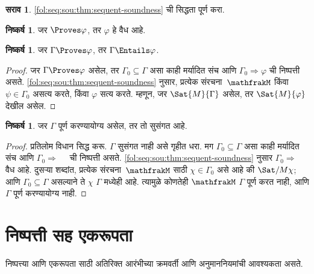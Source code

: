 \documentclass[11pt,a4paper,openany]{book}
\theoremstyle{definition}
\newtheorem{prob}{सराव}[chapter]
\newtheorem{cor}[defn]{निष्कर्ष}
\newcommand{\applytofirst}[2]{{\expandafter#1#2}}
\newcommand{\Struct}[1]{\applytofirst{\mathfrak}{#1}}
\newcommand{\Sequent}{\Rightarrow}
\begin{document}
\begin{prob}
\ref{fol:seq:sou:thm:sequent-soundness} ची सिद्धता पूर्ण करा.
\end{prob}




\begin{cor}
\label{fol:seq:sou:cor:weak-soundness}
जर $\Proves \varphi$, तर $\varphi$ हे वैध आहे.
\end{cor}

\begin{cor}
\label{fol:seq:sou:cor:entailment-soundness}
जर $\Gamma \Proves \varphi$, तर $\Gamma \Entails \varphi$.
\end{cor}

\begin{proof}
जर $\Gamma \Proves \varphi$ असेल, तर $\Gamma_0 \subseteq \Gamma$ असा काही
मर्यादित संच आणि $\Gamma_0 \Sequent \varphi$ ची निष्पत्ती असते. \ref{fol:seq:sou:thm:sequent-soundness}
नुसार, प्रत्येक
संरचना~$\Struct{M}$
किंवा $\psi \in \Gamma_0$ असत्य करते, किंवा $\varphi$ सत्य करते. म्हणून,
जर $\Sat{M}{\Gamma}$ असेल, तर
$\Sat{M}{\varphi}$ देखील असेल.
\end{proof}

\begin{cor}
\label{fol:seq:sou:cor:consistency-soundness}
जर $\Gamma$ पूर्ण करण्यायोग्य असेल, तर तो सुसंगत आहे.
\end{cor}

\begin{proof}
प्रतिलोम विधान सिद्ध करू. $\Gamma$ सुसंगत नाही असे गृहीत धरा. मग
$\Gamma_0 \subseteq \Gamma$ असा काही मर्यादित संच आणि
$\Gamma_0 \Sequent \quad$ ची निष्पत्ती असते. \ref{fol:seq:sou:thm:sequent-soundness}
नुसार $\Gamma_0 \Sequent \quad$ वैध आहे. दुसऱ्या शब्दांत, प्रत्येक
संरचना~$\Struct{M}$ साठी
$\chi \in \Gamma_0$ असे आहे की
$\Sat/{M}{\chi}$; आणि $\Gamma_0 \subseteq \Gamma$
असल्याने ते $\chi$ $\Gamma$ मध्येही आहे. त्यामुळे कोणतेही
$\Struct{M}$ $\Gamma$ पूर्ण करत नाही, आणि
$\Gamma$ पूर्ण करण्यायोग्य नाही.
\end{proof}









\section{निष्पत्ती सह एकरूपता}\label{fol:seq:ide:sec}

निष्पत्त्या आणि एकरूपता साठी अतिरिक्त आरंभीच्या क्रमवर्ती
आणि अनुमाननियमांची आवश्यकता असते.
\end{document}

